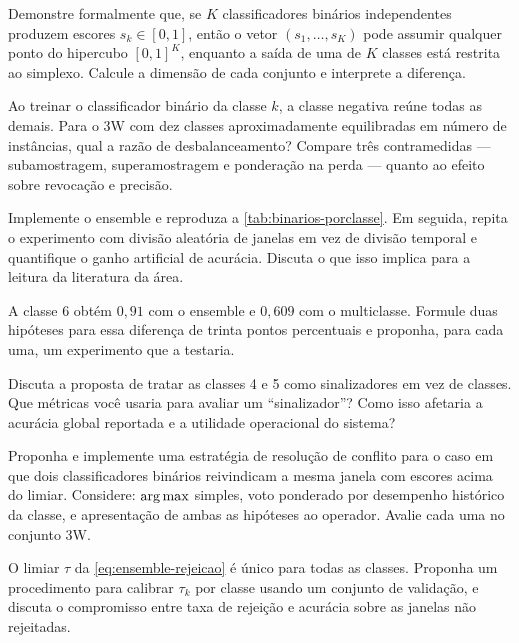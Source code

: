 \begin{exercicios}
\item Demonstre formalmente que, se $K$ classificadores binários independentes produzem
      escores $s_k \in [0,1]$, então o vetor $(s_1, \dots, s_K)$ pode assumir qualquer
      ponto do hipercubo $[0,1]^K$, enquanto a saída de uma  de $K$ classes
      está restrita ao simplexo. Calcule a dimensão de cada conjunto e interprete a
      diferença.

\item Ao treinar o classificador binário da classe $k$, a classe negativa reúne todas as
      demais. Para o 3W com dez classes aproximadamente equilibradas em número de
      instâncias, qual a razão de desbalanceamento? Compare três contramedidas ---
      subamostragem, superamostragem e ponderação na perda --- quanto ao efeito sobre
      revocação e precisão.

\item Implemente o ensemble e reproduza a \cref{tab:binarios-porclasse}. Em seguida,
      repita o experimento com divisão aleatória de janelas em vez de divisão temporal e
      quantifique o ganho artificial de acurácia. Discuta o que isso implica para a
      leitura da literatura da área.

\item A classe 6 obtém $0{,}91$ com o ensemble e $0{,}609$ com o multiclasse. Formule
      duas hipóteses para essa diferença de trinta pontos percentuais e proponha, para
      cada uma, um experimento que a testaria.

\item Discuta a proposta de tratar as classes 4 e 5 como sinalizadores em vez de
      classes. Que métricas você usaria para avaliar um ``sinalizador''? Como isso
      afetaria a acurácia global reportada e a utilidade operacional do sistema?

\item Proponha e implemente uma estratégia de resolução de conflito para o caso em que
      dois classificadores binários reivindicam a mesma janela com escores acima do
      limiar. Considere: $\operatorname*{arg\,max}$ simples, voto ponderado por desempenho histórico da
      classe, e apresentação de ambas as hipóteses ao operador. Avalie cada uma no
      conjunto 3W.

\item O limiar $\tau$ da \cref{eq:ensemble-rejeicao} é único para todas as classes.
      Proponha um procedimento para calibrar $\tau_k$ por classe usando um conjunto de
      validação, e discuta o compromisso entre taxa de rejeição e acurácia sobre as
      janelas não rejeitadas.
\end{exercicios}

